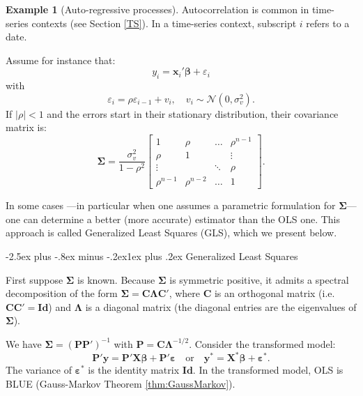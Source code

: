 \documentclass[
  11pt,
]{book}
\makeatletter
\renewcommand\subsection{\@startsection{subsection}{2}{\z@}
  {-2.5ex plus -.8ex minus -.2ex}{1ex plus .2ex}
  {\normalfont\large\bfseries\color{TextbookInk}}}
\theoremstyle{definition}
\theoremstyle{definition}
\newtheorem{example}{Example}[chapter]
\theoremstyle{definition}
\theoremstyle{definition}
\theoremstyle{remark}
\makeatother
\begin{document}
\begin{example}[Auto-regressive processes]
\protect\hypertarget{exm:autocorrelaaa}{}\label{exm:autocorrelaaa}Autocorrelation is common in time-series contexts (see Section \ref{TS}). In a time-series context, subscript \(i\) refers to a date.

Assume for instance that:
\begin{equation}
y_i = \mathbf{x}_i' \boldsymbol\beta + \varepsilon_i \label{eq:usual}
\end{equation}
with
\begin{equation}
\varepsilon_i = \rho \varepsilon_{i-1} + v_i, \quad v_i \sim \mathcal{N}(0,\sigma_v^2).\label{eq:usual2}
\end{equation}
If \(|\rho|<1\) and the errors start in their stationary distribution, their covariance matrix is:
\begin{equation}
\boldsymbol\Sigma =\frac{ \sigma_v^2}{1 - \rho^2} \left[    \begin{array}{cccc}
1 & \rho & \dots & \rho^{n-1} \\
\rho & 1 &  & \vdots \\
\vdots && \ddots& \rho \\
\rho^{n-1} & \rho^{n-2} & \dots & 1
\end{array} \right].\label{eq:SigmaAutocorrel}
\end{equation}
\end{example}

In some cases ---in particular when one assumes a parametric formulation for \(\boldsymbol\Sigma\)--- one can determine a better (more accurate) estimator than the OLS one. This approach is called Generalized Least Squares (GLS), which we present below.

\subsection{Generalized Least Squares}\label{GLS}

First suppose \(\boldsymbol\Sigma\) is known. Because \(\boldsymbol\Sigma\) is symmetric positive, it admits a spectral decomposition of the form \(\boldsymbol\Sigma = \mathbf{C} \boldsymbol\Lambda \mathbf{C}'\), where \(\mathbf{C}\) is an orthogonal matrix (i.e.~\(\mathbf{C}\mathbf{C}'=\mathbf{Id}\)) and \(\boldsymbol\Lambda\) is a diagonal matrix (the diagonal entries are the eigenvalues of \(\boldsymbol\Sigma\)).

We have \(\boldsymbol\Sigma = (\mathbf{P}\mathbf{P}')^{-1}\) with \(\mathbf{P} = \mathbf{C}\boldsymbol\Lambda^{-1/2}\). Consider the transformed model:
\[
\mathbf{P}'\mathbf{y} = \mathbf{P}'\mathbf{X}\boldsymbol\beta + \mathbf{P}'\boldsymbol\varepsilon \quad \mbox{or} \quad \mathbf{y}^* = \mathbf{X}^*\boldsymbol\beta + \boldsymbol\varepsilon^*.
\]
The variance of \(\boldsymbol\varepsilon^*\) is the identity matrix \(\mathbf{Id}\). In the transformed model, OLS is BLUE (Gauss-Markov Theorem \ref{thm:GaussMarkov}).
\end{document}
